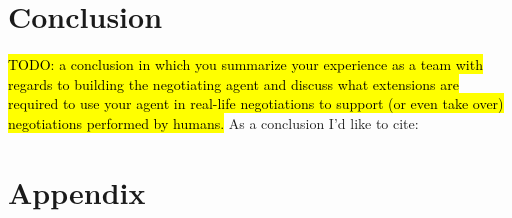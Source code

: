 \documentclass[a4paper,10pt]{article}
\newcommand{\todo}[1] {\hl{TODO: #1}}
\begin{document}
\section{Conclusion}
\label{sec:conclusion}
\todo{a conclusion in which you summarize your experience as a team with regards to building the negotiating agent and discuss what extensions are required to use your agent in real-life negotiations to support (or even take over) negotiations performed by humans.}
As a conclusion I'd like to cite: \cite{baarslag2012decoupling}




\newpage
\section*{Appendix}
\end{document}
